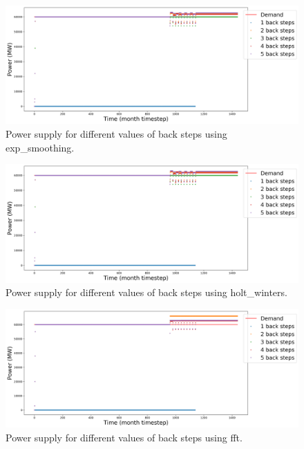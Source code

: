 \documentclass[11pt]{article}
\begin{document}
\begin{figure}[H]
	\centering
	\includegraphics[width=\textwidth]{23-figures/23-power-buffer0-exp_smoothing-back.png} 
	\hfill
	\caption{Power supply for different values of back steps using exp\_smoothing.}
	\label{fig:23-back-exp_smoothing}
\end{figure}

\begin{figure}[H]
	\centering
	\includegraphics[width=\textwidth]{23-figures/23-power-buffer0-holt_winters-back.png} 
	\hfill
	\caption{Power supply for different values of back steps using holt\_winters.}
	\label{fig:23-back-hots_winters}
\end{figure}

\begin{figure}[H]
	\centering
	\includegraphics[width=\textwidth]{23-figures/23-power-buffer0-fft-back.png} 
	\hfill
	\caption{Power supply for different values of back steps using fft.}
	\label{fig:23-back-fft}
\end{figure}
\end{document}
